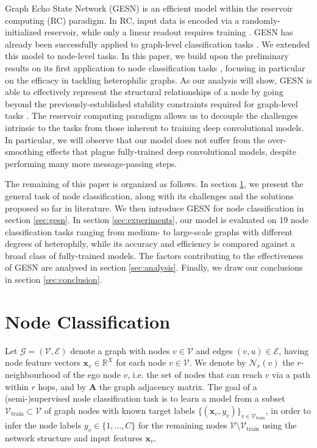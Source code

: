 \documentclass[final,5p,times,twocolumn]{elsarticle}
\begin{document}
Graph Echo State Network (GESN) \cite{Gallicchio2010} is an efficient model within the reservoir computing (RC) paradigm.
In RC, input data is encoded via a randomly-initialized reservoir, while only a linear readout requires training \cite{Nakajima2021}.
GESN has already been successfully applied to graph-level classification tasks \cite{Gallicchio2020}.
We extended this model to node-level tasks.
In this paper, we build upon the preliminary results on its first application to node classification tasks \cite{Tortorella2022esann}, focusing in particular on the efficacy in tackling heterophilic graphs.
As our analysis will show, GESN is able to effectively represent the structural relationships of a node by going beyond the previously-established stability constraints required for graph-level tasks \cite{Tortorella2022}.
The reservoir computing paradigm allows us to decouple the challenges intrinsic to the tasks from those inherent to training deep convolutional models.
In particular, we will observe that our model does not suffer from the over-smoothing effects that plague fully-trained deep convolutional models, despite performing many more message-passing steps.

The remaining of this paper is organized as follows.
In section \ref{sec:background}, we present the general task of node classification, along with its challenges and the solutions proposed so far in literature.
We then introduce GESN for node classification in section \ref{sec:gesn}.
In section \ref{sec:experiments}, our model is evaluated on 19 node classification tasks ranging from medium- to large-scale graphs with different degrees of heterophily, while its accuracy and efficiency is compared against a broad class of fully-trained models.
The factors contributing to the effectiveness of GESN are analysed in section \ref{sec:analysis}.
Finally, we draw our conclusions in section \ref{sec:conclusion}.

\section{Node Classification}
\label{sec:background}

Let $\mathcal{G} = (\mathcal{V}, \mathcal{E})$ denote a graph with nodes $v \in \mathcal{V}$ and edges $(v,u) \in \mathcal{E}$, having node feature vectors $\mathbf{x}_v \in \mathbb{R}^X$ for each node $v \in \mathcal{V}$.
We denote by $\mathcal{N}_r(v)$ the $r$-neighbourhood of the ego node $v$, i.e. the set of nodes that can reach $v$ via a path within $r$ hops, and by $\mathbf{A}$ the graph adjacency matrix.
The goal of a (semi-)supervised node classification task is to learn a model from a subset $\mathcal{V}_{\mathrm{train}} \subset \mathcal{V}$ of graph nodes with known target labels $\{(\mathbf{x}_v, y_v)\}_{v \in \mathcal{V}_{\mathrm{train}}}$, in order to infer the node labels $y_v \in \{1, ..., C\}$ for the remaining nodes $\mathcal{V} \setminus \mathcal{V}_{\mathrm{train}}$ using the network structure and input features $\mathbf{x}_v$.
\end{document}

